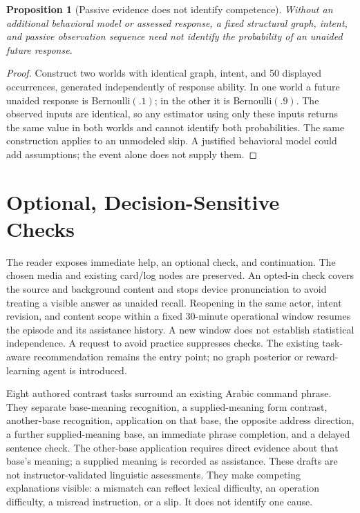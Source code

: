 \documentclass{article}
\newtheorem{proposition}{Proposition}
\begin{document}
\begin{proposition}[Passive evidence does not identify competence]
\label{prop:nonidentifiable}
Without an additional behavioral model or assessed response, a fixed structural graph, intent, and passive observation sequence need not identify the probability of an unaided future response.
\end{proposition}
\begin{proof}
Construct two worlds with identical graph, intent, and 50 displayed occurrences, generated independently of response ability. In one world a future unaided response is Bernoulli$(.1)$; in the other it is Bernoulli$(.9)$. The observed inputs are identical, so any estimator using only these inputs returns the same value in both worlds and cannot identify both probabilities. The same construction applies to an unmodeled skip. A justified behavioral model could add assumptions; the event alone does not supply them.
\end{proof}

\section{Optional, Decision-Sensitive Checks}
\label{sec:policy}

The reader exposes immediate help, an optional check, and continuation. The chosen media and existing card/log nodes are preserved. An opted-in check covers the source and background content and stops device pronunciation to avoid treating a visible answer as unaided recall. Reopening in the same actor, intent revision, and content scope within a fixed 30-minute operational window resumes the episode and its assistance history. A new window does not establish statistical independence. A request to avoid practice suppresses checks. The existing task-aware recommendation remains the entry point; no graph posterior or reward-learning agent is introduced.

Eight authored contrast tasks surround an existing Arabic command phrase. They separate base-meaning recognition, a supplied-meaning form contrast, another-base recognition, application on that base, the opposite address direction, a further supplied-meaning base, an immediate phrase completion, and a delayed sentence check. The other-base application requires direct evidence about that base's meaning; a supplied meaning is recorded as assistance. These drafts are not instructor-validated linguistic assessments. They make competing explanations visible: a mismatch can reflect lexical difficulty, an operation difficulty, a misread instruction, or a slip. It does not identify one cause.
\end{document}
